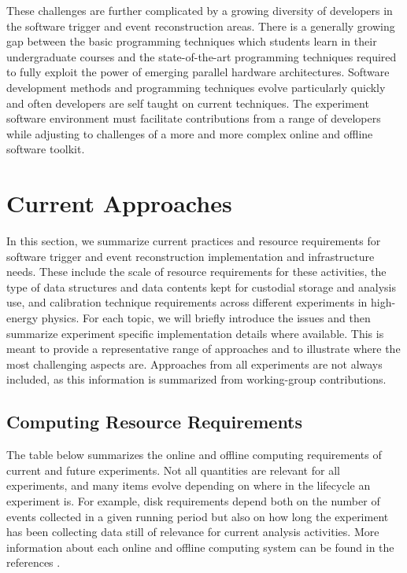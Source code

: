 These challenges are further complicated by a growing diversity of developers in the software trigger and event reconstruction areas. There is a generally growing gap between the basic 
programming techniques which students learn in their undergraduate courses and the state-of-the-art programming techniques required to fully exploit the power of emerging parallel hardware 
architectures. Software development methods and programming techniques evolve particularly quickly and often developers are self taught on current techniques. The experiment software environment 
must facilitate contributions from a range of developers while adjusting to challenges of a more and more complex online and offline software toolkit.

\section{Current Approaches}

In this section, we summarize current practices and resource requirements for software trigger and event reconstruction implementation and infrastructure needs. These include the scale of resource 
requirements for these activities, the type of data structures and data contents kept for custodial storage and analysis use, and calibration technique requirements across different experiments in 
high-energy physics. For each topic, we will briefly introduce the issues and then summarize experiment specific implementation details where available. This is meant to provide a representative 
range of approaches and to illustrate where the most challenging aspects are. Approaches from all experiments are not always included, as this information is summarized 
from working-group contributions. 

\subsection{Computing Resource Requirements}

The table below summarizes the online and offline computing requirements of current and future experiments. Not all quantities are relevant for all experiments, and many items evolve depending 
on where in the lifecycle an experiment is. For example, disk requirements depend both on the number of events collected in a given running period but also on how long the experiment has been 
collecting data still of relevance for current analysis activities. More information about each online and offline computing system can be found in the 
references \cite{ALICE2015, Allton2017, ATLAS2015, CMS2015, DUNE2015, DUNE2017, LHCb2017, Miyamoto2015, Richter2016}.

